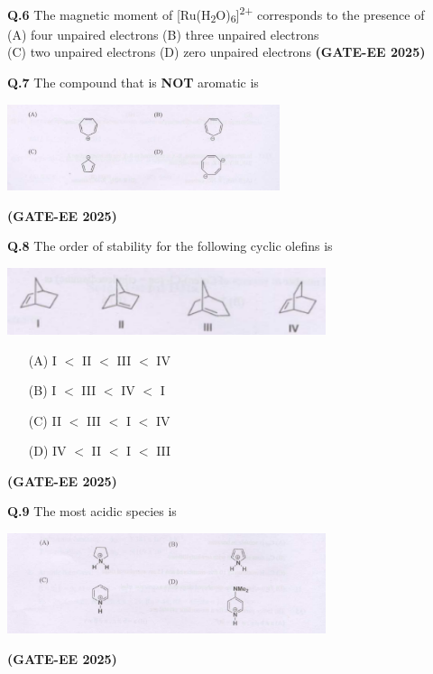 \documentclass[12pt]{article}
\begin{document}
\begin{enumerate}
    \vspace{0.5cm}

    \textbf{Q.6} The magnetic moment of [Ru(H\textsubscript{2}O)\textsubscript{6}]\textsuperscript{2+} corresponds to the presence of\\
    (A) four unpaired electrons \quad
    (B) three unpaired electrons\\
    (C) two unpaired electrons \quad
    (D) zero unpaired electrons   \textbf{(GATE-EE 2025)}


    \vspace{0.5cm}

\textbf{Q.7} \quad The compound that is \textbf{NOT} aromatic is

\begin{center}
  \includegraphics[width=0.6\textwidth]{q7.png} 
\end{center}

\bigskip
   \textbf{(GATE-EE 2025)}


\textbf{Q.8} The order of stability for the following cyclic olefins is

\begin{center}
  \includegraphics[width=0.7\textwidth]{q8.png} 
\end{center}

\begin{itemize}
  \item[(A)] I \(<\) II \(<\) III \(<\) IV
  \item[(B)] I \(<\) III \(<\) IV \(<\) I
  \item[(C)] II \(<\) III \(<\) I \(<\) IV
  \item[(D)] IV \(<\) II \(<\) I \(<\) III
\end{itemize}   \textbf{(GATE-EE 2025)}


\textbf{Q.9} The most acidic species is

\begin{center}
  \includegraphics[width=0.7\textwidth]{q9.png} 
\end{center}   \textbf{(GATE-EE 2025)}



\end{enumerate}
\end{document}

